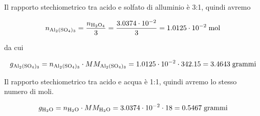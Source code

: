 \begin{soluzione}
Il rapporto stechiometrico tra acido e solfato di alluminio è 3:1, quindi avremo

$$n_{\rm Al_2(SO_4)_3}=\frac{n_{\rm H_2O_4}}{3}
=\frac{3.0374 \cdot 10^{-2}}{3}
=1.0125 \cdot 10^{-2} \; \rm mol$$

da cui

$$g_{\rm Al_2(SO_4)_3}=n_{\rm Al_2(SO_4)_3} \cdot MM_{\rm Al_2(SO_4)_3}
=1.0125 \cdot 10^{-2} \cdot 342.15
=3.4643 \; \rm grammi$$

Il rapporto stechiometrico tra acido e acqua è 1:1, quindi avremo lo stesso numero di moli.

$$g_{\rm H_2O}=n_{\rm H_2O} \cdot MM_{\rm H_2O}
=3.0374 \cdot 10^{-2} \cdot 18
=0.5467 \; \rm grammi$$

\end{soluzione}

\newpage

